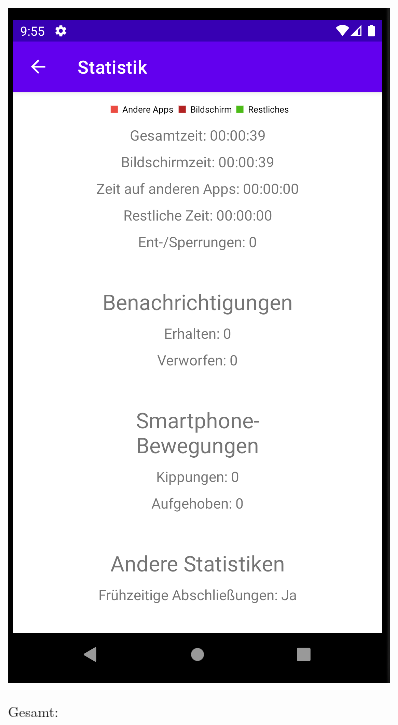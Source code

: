 \documentclass{article}
\begin{document}
\begin{center}
    \includegraphics[scale=0.45]{stats_phase_2.png}
\end{center}
\newpage
\centering Gesamt:
\end{document}
